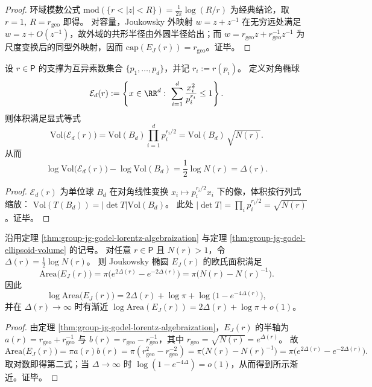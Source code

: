 \begin{proof}
环域模数公式 \(\mathrm{mod}(\{r<|z|<R\})=\frac{1}{2\pi}\log(R/r)\) 为经典结论，取 \(r=1,\ R=r_{\mathrm{geo}}\) 即得。
对容量，Joukowsky 外映射 \(w=z+z^{-1}\) 在无穷远处满足 \(w=z+O(z^{-1})\)，故外域的共形半径由外圆半径给出；而 \(w=r_{\mathrm{geo}}z+r_{\mathrm{geo}}^{-1}z^{-1}\) 为尺度变换后的同型外映射，因而 \(\mathrm{cap}(E_J(r))=r_{\mathrm{geo}}\)。证毕。
\end{proof}

\begin{theorem}\label{thm:group-jg-godel-ellipsoid-volume}
设 \(r\in\mathsf P\) 的支撑为互异素数集合 \(\{p_1,\dots,p_d\}\)，并记 \(r_i:=r(p_i)\)。
定义对角椭球
\[
\mathcal E_d(r):=\left\{x\in\RR^d:\ \sum_{i=1}^d \frac{x_i^2}{p_i^{r_i}}\le 1\right\}.
\]
则体积满足显式等式
\[
\mathrm{Vol}\bigl(\mathcal E_d(r)\bigr)
=\mathrm{Vol}(B_d)\prod_{i=1}^d p_i^{r_i/2}
=\mathrm{Vol}(B_d)\,\sqrt{N(r)}.
\]
从而
\[
\log\mathrm{Vol}\bigl(\mathcal E_d(r)\bigr)-\log\mathrm{Vol}(B_d)=\frac12\log N(r)=\Delta(r).
\]
\end{theorem}

\begin{proof}
\(\mathcal E_d(r)\) 为单位球 \(B_d\) 在对角线性变换 \(x_i\mapsto p_i^{r_i/2}x_i\) 下的像，体积按行列式缩放：
\(
\mathrm{Vol}(T(B_d))=|\det T|\mathrm{Vol}(B_d)
\)。
此处 \(|\det T|=\prod_i p_i^{r_i/2}=\sqrt{N(r)}\)。证毕。
\end{proof}

\begin{corollary}[体积差与椭圆面积的解析同一化]\label{cor:group-jg-ellipse-area-ellipsoid-gap}
沿用定理 \ref{thm:group-jg-godel-lorentz-algebraization} 与定理 \ref{thm:group-jg-godel-ellipsoid-volume} 的记号。
对任意 \(r\in\mathsf P\) 且 \(N(r)>1\)，令 \(\Delta(r)=\frac12\log N(r)\)。
则 Joukowsky 椭圆 \(E_J(r)\) 的欧氏面积满足
\[
\mathrm{Area}\bigl(E_J(r)\bigr)=\pi\bigl(e^{2\Delta(r)}-e^{-2\Delta(r)}\bigr)=\pi\bigl(N(r)-N(r)^{-1}\bigr).
\]
因此
\[
\log \mathrm{Area}\bigl(E_J(r)\bigr)=2\Delta(r)+\log\pi+\log\bigl(1-e^{-4\Delta(r)}\bigr),
\]
并在 \(\Delta(r)\to\infty\) 时有渐近 \(\log\mathrm{Area}(E_J(r))=2\Delta(r)+\log\pi+o(1)\)。
\end{corollary}
\begin{proof}
由定理 \ref{thm:group-jg-godel-lorentz-algebraization}，\(E_J(r)\) 的半轴为
\(
a(r)=r_{\mathrm{geo}}+r_{\mathrm{geo}}^{-1}
\)
与
\(
b(r)=r_{\mathrm{geo}}-r_{\mathrm{geo}}^{-1}
\)，其中 \(r_{\mathrm{geo}}=\sqrt{N(r)}=e^{\Delta(r)}\)。
故
\[
\mathrm{Area}\bigl(E_J(r)\bigr)=\pi a(r)b(r)=\pi(r_{\mathrm{geo}}^2-r_{\mathrm{geo}}^{-2})
=\pi\bigl(N(r)-N(r)^{-1}\bigr)
=\pi\bigl(e^{2\Delta(r)}-e^{-2\Delta(r)}\bigr).
\]
取对数即得第二式；当 \(\Delta\to\infty\) 时 \(\log(1-e^{-4\Delta})=o(1)\)，从而得到所示渐近。证毕。
\end{proof}

